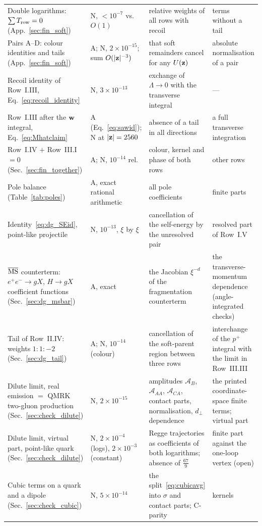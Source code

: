 \begin{longtable}{@{}>{\raggedright\arraybackslash}p{}>{\raggedright\arraybackslash}p{}>{\raggedright\arraybackslash}p{}>{\raggedright\arraybackslash}p{}@{}}
Double logarithms: $\sum T_{\rm row}=0$ (App.~\ref{sec:fin_soft}) & N, $<10^{-7}$ vs.\ $O(1)$ & relative weights of all rows with recoil & terms without a tail\\
Pairs A--D: colour identities and tails (App.~\ref{sec:fin_soft}) & A; N, $2\times10^{-15}$; sum $O(|\mathbf{z}|^{-3})$ & that soft remainders cancel for any $U(\mathbf{z})$ & absolute normalisation of a pair\\
Recoil identity of Row~I.III, Eq.~\eqref{eq:recoil_identity} & N, $3\times10^{-13}$ & exchange of $\Lambda\to0$ with the transverse integral & ---\\
Row~I.III after the $\mathbf{w}$ integral, Eq.~\eqref{eq:Mhatclaim} & A (Eq.~\eqref{eq:sawid}); N at $|\mathbf{z}|=2560$ & absence of a tail in all directions & a full transverse integration\\
Row~I.IV $+$ Row~III.I $=0$ (Sec.~\ref{sec:fin_together}) & A; N, $10^{-14}$ rel. & colour, kernel and phase of both rows & other rows\\
Pole balance (Table~\ref{tab:poles}) & A, exact rational arithmetic & all pole coefficients & finite parts\\
Identity~\eqref{eq:dg_SEid}, point-like projectile & N, $10^{-13}$, $\xi$ by $\xi$ & cancellation of the self-energy by the unresolved pair & resolved part of Row~I.V\\
$\overline{\rm MS}$ counterterm: $e^+e^-\to gX$, $H\to gX$ coefficient functions (Sec.~\ref{sec:dg_msbar}) & A, exact & the Jacobian $\xi^{-d}$ of the fragmentation counterterm & the transverse-momentum dependence (angle-integrated checks)\\
Tail of Row~II.IV: weights $1:1:-2$ (Sec.~\ref{sec:dg_tail}) & A; N, $10^{-14}$ (colour) & cancellation of the soft-parent region between three rows & interchange of the $p^+$ integral with the limit in Row~III.III\\
Dilute limit, real emission $=$ QMRK two-gluon production (Sec.~\ref{sec:check_dilute}) & N, $2\times10^{-15}$ & amplitudes $\mathcal A_B$, $\mathcal A_{AA}$, $\mathcal A_{CA}$, contact parts, normalisation, $d_\perp$ dependence & the printed coordinate-space finite terms; virtual part\\
Dilute limit, virtual part, point-like quark (Sec.~\ref{sec:check_dilute}) & N, $2\times10^{-4}$ (logs), $2\times10^{-3}$ (constant) & Regge trajectories as coefficients of both logarithms; absence of $\frac{67}{9}$ & finite part against the one-loop vertex (open)\\
Cubic terms on a quark and a dipole (Sec.~\ref{sec:check_cubic}) & N, $5\times10^{-14}$ & the split~\eqref{eq:cubicavg} into $\sigma$ and contact parts; C-parity & kernels\\

\end{longtable}
